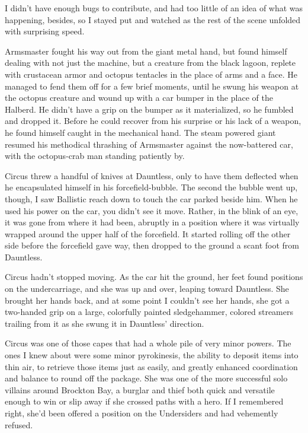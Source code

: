 I didn't have enough bugs to contribute, and had too little of an idea of what was happening, besides, so I stayed put and watched as the rest of the scene unfolded with surprising speed.



Armsmaster fought his way out from the giant metal hand, but found himself dealing with not just the machine, but a creature from the black lagoon, replete with crustacean armor and octopus tentacles in the place of arms and a face.  He managed to fend them off for a few brief moments, until he swung his weapon at the octopus creature and wound up with a car bumper in the place of the Halberd.  He didn't have a grip on the bumper as it materialized, so he fumbled and dropped it.  Before he could recover from his surprise or his lack of a weapon, he found himself caught in the mechanical hand.  The steam powered giant resumed his methodical thrashing of Armsmaster against the now-battered car, with the octopus-crab man standing patiently by.



Circus threw a handful of knives at Dauntless, only to have them deflected when he encapsulated himself in his forcefield-bubble.  The second the bubble went up, though, I saw Ballistic reach down to touch the car parked beside him.  When he used his power on the car, you didn't see it move.  Rather, in the blink of an eye, it was gone from where it had been, abruptly in a position where it was virtually wrapped around the upper half of the forcefield.  It started rolling off the other side before the forcefield gave way, then dropped to the ground a scant foot from Dauntless.



Circus hadn't stopped moving.  As the car hit the ground, her feet found positions on the undercarriage, and she was up and over, leaping toward Dauntless.  She brought her hands back, and at some point I couldn't see her hands, she got a two-handed grip on a large, colorfully painted sledgehammer, colored streamers trailing from it as she swung it in Dauntless' direction.



Circus was one of those capes that had a whole pile of very minor powers.  The ones I knew about were some minor pyrokinesis, the ability to deposit items into thin air, to retrieve those items just as easily, and greatly enhanced coordination and balance to round off the package.  She was one of the more successful solo villains around Brockton Bay, a burglar and thief both quick and versatile enough to win or slip away if she crossed paths with a hero.  If I remembered right, she'd been offered a position on the Undersiders and had vehemently refused.



